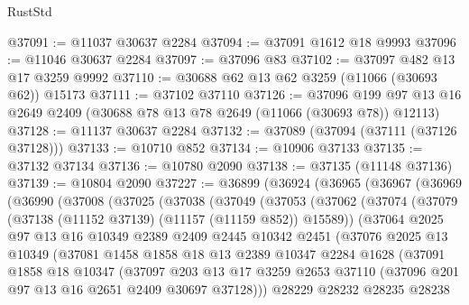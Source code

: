 \begin{lexlean}{RustStd}
\begin{coremodule}
@37091 := @11037 @30637 @2284
@37094 := @37091 @1612 @18 @9993
@37096 := @11046 @30637 @2284
@37097 := @37096 @83
@37102 := @37097 @482 @13 @17 @3259 @9992
@37110 := @30688 @62 @13 @62 @3259 (@11066 (@30693 @62)) @15173
@37111 := @37102 @37110
@37126 := @37096
    @199
    @97
    @13
    @16
    @2649
    @2409
    (@30688 @78 @13 @78 @2649 (@11066 (@30693 @78)) @12113)
@37128 := @11137 @30637 @2284
@37132 := @37089 (@37094 (@37111 (@37126 @37128)))
@37133 := @10710 @852
@37134 := @10906 @37133
@37135 := @37132 @37134
@37136 := @10780 @2090
@37138 := @37135 (@11148 @37136)
@37139 := @10804 @2090
@37227 := @36899
    (@36924
      (@36965
        (@36967
          (@36969
            (@36990
              (@37008
                (@37025
                  (@37038
                    (@37049
                      (@37053
                        (@37062
                          (@37074
                            (@37079 (@37138 (@11152 @37139) (@11157 (@11159 @852)) @15589))
                            (@37064
                              @2025
                              @97
                              @13
                              @16
                              @10349
                              @2389
                              @2409
                              @2445
                              @10342
                              @2451
                              (@37076
                                @2025
                                @13
                                @10349
                                (@37081
                                  @1458
                                  @1858
                                  @18
                                  @13
                                  @2389
                                  @10347
                                  @2284
                                  @1628
                                  (@37091
                                    @1858
                                    @18
                                    @10347
                                    (@37097
                                      @203
                                      @13
                                      @17
                                      @3259
                                      @2653
                                      @37110
                                      (@37096 @201 @97 @13 @16 @2651 @2409 @30697 @37128)))
                                  @28229
                                  @28232
                                  @28235
                                  @28238

\end{coremodule}
\end{lexlean}
